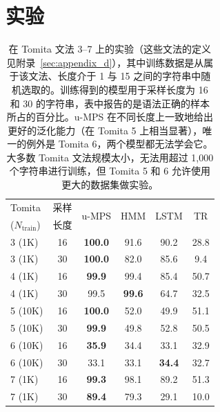 \documentclass[twoside]{article}
\begin{document}
\section{实验}
\label{sec:experiments}
%
\begin{table}[t]
\caption{在 Tomita 文法 3--7 上的实验（这些文法的定义见附录~\ref{sec:appendix_d}），其中训练数据是从属于该文法、长度介于 1 与 15 之间的字符串中随机选取的。训练得到的模型用于采样长度为 16 和 30 的字符串，表中报告的是语法正确的样本所占的百分比。u-MPS 在不同长度上一致地给出更好的泛化能力（在 Tomita 5 上相当显著），唯一的例外是 Tomita 6，两个模型都无法学会它。大多数 Tomita 文法规模太小，无法用超过 1,000 个字符串进行训练，但 Tomita 5 和 6 允许使用更大的数据集做实验。}
\label{tab:tomita}
\setlength\aboverulesep{0.1pt}
\setlength\belowrulesep{0.1pt}
\renewcommand{\arraystretch}{1.1}
\begin{center}
\begin{small}
\begin{sc}
\begin{tabular}{lc|cccc}
    Tomita & 采样 & \multirow{2}{*}{u-MPS} & \multirow{2}{*}{HMM} & \multirow{2}{*}{LSTM} & \multirow{2}{*}{TR} \\
    ($N_{\mathrm{train}}$) & 长度 &  &  &  \\
    \midrule
    3 (1K)  & 16 & \textbf{100.0} & 91.6          & 90.2          & 28.8 \\
    3 (1K)  & 30 & \textbf{100.0} & 82.0          & 85.6          & 9.4  \\
    4 (1K)  & 16 & \textbf{99.9}  & 99.4          & 85.4          & 50.7 \\
    4 (1K)  & 30 & 99.5           & \textbf{99.6} & 64.7          & 32.5 \\
    5 (10K) & 16 & \textbf{100.0} & 52.0          & 49.9          & 51.1 \\
    5 (10K) & 30 & \textbf{99.9}  & 49.8          & 52.8          & 50.5 \\
    6 (10K) & 16 & \textbf{35.9}  & 34.4          & 33.1          & 32.9 \\
    6 (10K) & 30 & 33.1           & 33.1          & \textbf{34.4} & 32.7 \\
    7 (1K)  & 16 & \textbf{99.3}  & 98.1          & 89.2          & 51.3 \\
    7 (1K)  & 30 & \textbf{89.4}  & 79.3          & 29.1          & 10.0 \\


\end{tabular}
\end{sc}
\end{small}
\end{center}
\end{table}
\end{document}
